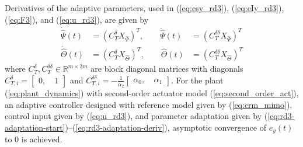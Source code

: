Derivatives of the adaptive parameters, used in (\ref{eq:esy_rd3}), (\ref{eq:eIy_rd3}), (\ref{eq:F3}), and (\ref{eq:u_rd3}), are given by
\begin{equation}
\begin{aligned}
	\dot{\hat{\Psi}}(t) &= (C_T^\delta X_{\hat{\Psi}})^T, \qquad \ddot{\hat{\Psi}}(t) &= (C_T^{\delta\delta}X_{\hat{\Psi}})^T \\
	\dot{\hat{\Theta}}(t) &= (C_T^\delta X_{\hat{\Theta}})^T, \qquad \ddot{\hat{\Theta}}(t) &= (C_T^{\delta\delta}X_{\hat{\Theta}})^T
\end{aligned} \label{eq:rd3-adaptation-deriv}
\end{equation}
where $C_T^{\delta}, C_T^{\delta \delta} \in \mathbb{R}^{m \times 2m}$ are block diagonal matrices with diagonals $C_{T,i}^{\delta} = \begin{bmatrix} 0,~ & 1	\end{bmatrix}$ and $C_{T,i}^{\delta\delta} = -\frac{1}{\alpha_2}\begin{bmatrix} \alpha_0,~ & \alpha_1 \end{bmatrix}$. For the plant (\ref{eq:plant_dynamics}) with second-order actuator model (\ref{eq:second_order_act}), an adaptive controller designed with reference model given by (\ref{eq:crm_mimo}), control input given by (\ref{eq:u_rd3}), and parameter adaptation given by (\ref{eq:rd3-adaptation-start})--(\ref{eq:rd3-adaptation-deriv}), asymptotic convergence of $e_y(t)$ to 0 is achieved.


